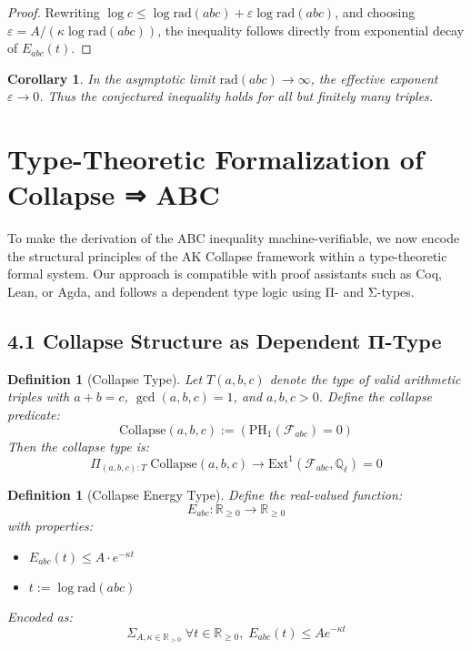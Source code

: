 \documentclass[11pt]{article}
\newtheorem{definition}[theorem]{Definition}
\newtheorem{corollary}[theorem]{Corollary}
\begin{document}
\begin{proof}
Rewriting \( \log c \leq \log \mathrm{rad}(abc) + \varepsilon \log \mathrm{rad}(abc) \), and choosing \( \varepsilon = A / (\kappa \log \mathrm{rad}(abc)) \), the inequality follows directly from exponential decay of \( E_{abc}(t) \).
\end{proof}

\begin{corollary}
In the asymptotic limit \( \mathrm{rad}(abc) \to \infty \), the effective exponent \( \varepsilon \to 0 \). Thus the conjectured inequality holds for all but finitely many triples.
\end{corollary}



\section{Type-Theoretic Formalization of Collapse ⇒ ABC}

To make the derivation of the ABC inequality machine-verifiable, we now encode the structural principles of the AK Collapse framework within a type-theoretic formal system. Our approach is compatible with proof assistants such as Coq, Lean, or Agda, and follows a dependent type logic using Π- and Σ-types.

\subsection{4.1 Collapse Structure as Dependent Π-Type}

\begin{definition}[Collapse Type]
Let \( T(a,b,c) \) denote the type of valid arithmetic triples with \( a+b=c \), \( \gcd(a,b,c)=1 \), and \( a,b,c > 0 \). Define the collapse predicate:
\[
\mathrm{Collapse}(a,b,c) := \left( \mathrm{PH}_1(\mathcal{F}_{abc}) = 0 \right)
\]
Then the collapse type is:
\[
\Pi_{(a,b,c):T} \; \mathrm{Collapse}(a,b,c) \to \mathrm{Ext}^1(\mathcal{F}_{abc}, \mathbb{Q}_\ell) = 0
\]
\end{definition}

\begin{definition}[Collapse Energy Type]
Define the real-valued function:
\[
E_{abc} : \mathbb{R}_{\geq 0} \to \mathbb{R}_{\geq 0}
\]
with properties:
\begin{itemize}
    \item \( E_{abc}(t) \leq A \cdot e^{-\kappa t} \)
    \item \( t := \log \mathrm{rad}(abc) \)
\end{itemize}
Encoded as:
\[
\Sigma_{A, \kappa \in \mathbb{R}_{>0}} \; \forall t \in \mathbb{R}_{\geq 0},\; E_{abc}(t) \leq A e^{-\kappa t}
\]
\end{definition}
\end{document}

